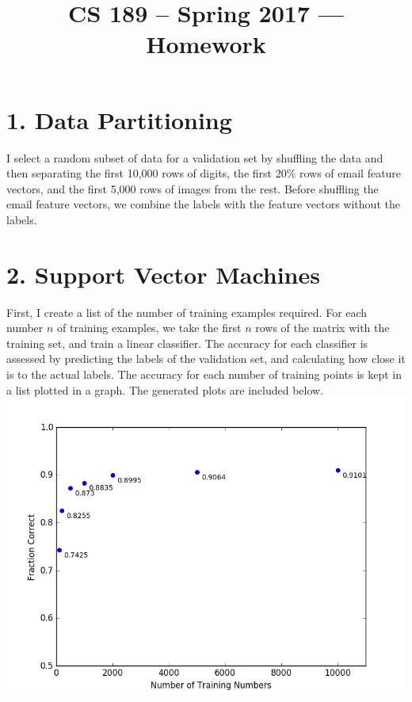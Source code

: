 \documentclass[11pt]{article}
\title{CS 189 -- Spring 2017 --- Homework \Homework}
\author{\Name}%
\date{}
\begin{document}
\maketitle

\section*{1. Data Partitioning}
I select a random subset of data for a validation set by shuffling the data and then separating the first 10,000 rows of digits, the first 20\% rows of email feature vectors, and the first 5,000 rows of images from the rest. Before shuffling the email feature vectors, we combine the labels with the feature vectors without the labels.

\section*{2. Support Vector Machines}
First, I create a list of the number of training examples required. For each number $n$ of training examples, we take the first $n$ rows of the matrix with the training set, and train a linear classifier. The accuracy for each classifier is assessed by predicting the labels of the validation set, and calculating how close it is to the actual labels. The accuracy for each number of training points is kept in a list plotted in a graph. The generated plots are included below.\\

\includegraphics[scale=.7]{mnist_plot_2.png}\\
\end{document}
